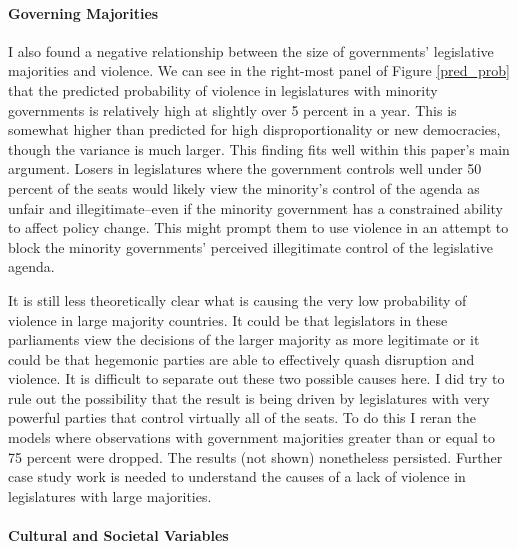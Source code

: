 \documentclass[a4paper]{article}\usepackage{graphicx, color}
\begin{document}
\paragraph{Governing Majorities}

I also found a negative relationship between the size of governments' legislative majorities and violence. We can see in the right-most panel of Figure \ref{pred_prob} that the predicted probability of violence in legislatures with minority governments is relatively high at slightly over 5 percent in a year. This is somewhat higher than predicted for high disproportionality or new democracies, though the variance is much larger. This finding fits well within this paper's main argument. Losers in legislatures where the government controls well under 50 percent of the seats would likely view the minority's control of the agenda as unfair and illegitimate--even if the minority government has a constrained ability to affect policy change. This might prompt them to use violence in an attempt to block the minority governments' perceived illegitimate control of the legislative agenda. 

It is still less theoretically clear what is causing the very low probability of violence in large majority countries. It could be that legislators in these parliaments view the decisions of the larger majority as more legitimate or it could be that hegemonic parties are able to effectively quash disruption and violence. It is difficult to separate out these two possible causes here. I did try to rule out the possibility that the result is being driven by legislatures with very powerful parties that control virtually all of the seats. To do this I reran the models where observations with government majorities greater than or equal to 75 percent were dropped. The results (not shown) nonetheless persisted. Further case study work is needed to understand the causes of a lack of violence in legislatures with large majorities.

\paragraph{Cultural and Societal Variables}
\end{document}
